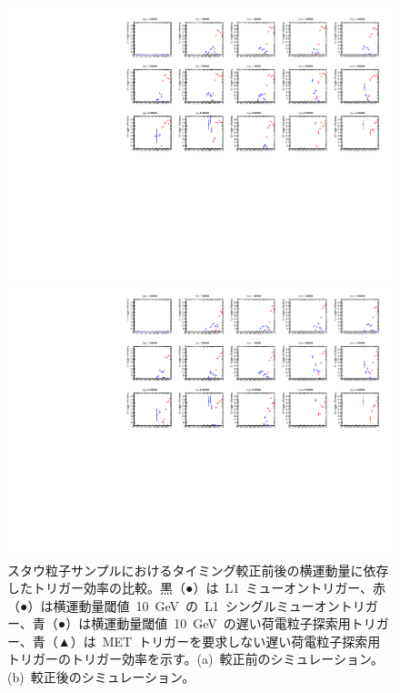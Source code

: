 \begin{figure}[H]
    \begin{minipage}{0.49\hsize}
    \centering   
    \includegraphics[width=\textwidth,page=4]{img/rec/stau_600_ori.pdf}
    \subcaption{}
    \end{minipage}
    \begin{minipage}{0.49\hsize}
    \centering   
    \includegraphics[width=\textwidth,page=4]{img/rec/stau_600.pdf}
    \subcaption{}
    \end{minipage}
    \caption[スタウ粒子サンプルにおけるタイミング較正前後の横運動量に依存したトリガー効率の比較]{スタウ粒子サンプルにおけるタイミング較正前後の横運動量に依存したトリガー効率の比較。黒（●）は~L1~ミューオントリガー、赤（●）は横運動量閾値~10~GeV~の~L1~シングルミューオントリガー、青（●）は横運動量閾値~10~GeV~の遅い荷電粒子探索用トリガー、青（▲）は~MET~トリガーを要求しない遅い荷電粒子探索用トリガーのトリガー効率を示す。(a)~較正前のシミュレーション。(b)~較正後のシミュレーション。}\label{fig:tript}
\end{figure}
